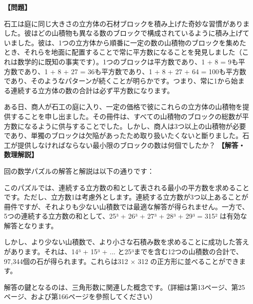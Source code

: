 \documentclass[10pt,a4paper,oneside,openany]{ltjsbook}
\begin{document}
\begin{tcolorbox}[colback=softblue,colframe=primaryblue,title=\textbf{第 135 問：THE STONEMASON'S PROBLEM.},arc=2mm,boxrule=1pt,breakable]
\textbf{【問題】}\par\vspace{0.3em}
石工は庭に同じ大きさの立方体の石材ブロックを積み上げた奇妙な習慣がありました。彼はどの山積物も異なる数のブロックで構成されているように積み上げていました。彼は、1つの立方体から順番に一定の数の山積物のブロックを集めたとき、それらを地面に配置することで常に平方数になることを発見しました（これは数学的に既知の事実です）。1つのブロックは平方数であり、1 + 8 = 9も平方数であり、1 + 8 + 27 = 36も平方数であり、1 + 8 + 27 + 64 = 100も平方数であり、そのようなパターンが続くことが明らかです。つまり、常に1から始まる連続する立方体の数の合計は必ず平方数になります。

ある日、商人が石工の庭に入り、一定の価格で彼にこれらの立方体の山積物を提供することを申し出ました。その冊件は、すべての山積物のブロックの総数が平方数になるように供与することでした。しかし、商人は3つ以上の山積物が必要であり、単獨のブロックは欠陥があったため取り扱いたくないと斷りました。石工が提供しなければならない最小限のブロックの数は何個でしたか？
\tcblower
\textbf{【解答・数理解説】}\par\vspace{0.3em}
回の数学パズルの解答と解説は以下の通りです：

このパズルでは、連続する立方数の和として表される最小の平方数を求めることです。ただし、立方数1は考慮外とします。連続する立方数が3つ以上あることが冊件ですが、それよりも少ない山積数では最適な解答が得られません。一方で、5つの連続する立方数の和として、25³ + 26³ + 27³ + 28³ + 29³ = 315² は有効な解答となります。

しかし、より少ない山積数で、より小さな石積み数を求めることに成功した答えがあります。それは、14³ + 15³ + ... と25³までを含む12つの山積数の合計で、97,344個の石が得られます。これらは312 × 312 の正方形に並べることができます。

解答の鍵となるのは、三角形数に関連した概念です。（詳細は第13ページ、第25ページ、および第166ページを參照してください）
\end{tcolorbox}
\end{document}
